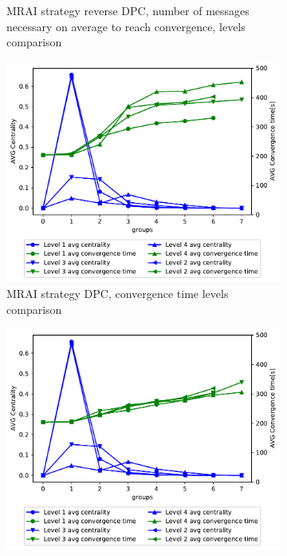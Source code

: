 \begin{figure}[h]
\begin{subfigure}[b]{0.45\textwidth}
		 \caption{\ac{MRAI} strategy reverse \ac{DPC}, number of messages necessary on
			average to reach convergence, levels comparison}
         \label{fig:different_levels_comparison_reverse_dpc_msg}
     \end{subfigure}
     \begin{subfigure}[b]{0.45\textwidth}
         \centering
         \includegraphics[width=\textwidth]{images/hierarchy/dpc_all_levels_comparison_centVStime.pdf}
		 \caption{\ac{MRAI} strategy \ac{DPC}, convergence time levels comparison}
         \label{fig:different_levels_comparison_dpc_time}
     \end{subfigure}
     \begin{subfigure}[b]{0.45\textwidth}
         \centering
         \includegraphics[width=\textwidth]{images/hierarchy/reverse_dpc_all_levels_comparison_centVStime.pdf}

\end{subfigure}
\end{figure}
